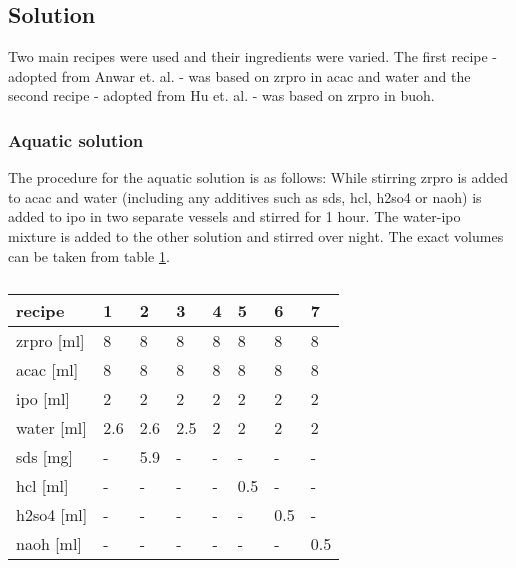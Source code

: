 \documentclass[a4paper]{article}
\begin{document}
\subsection{Solution}
Two main recipes were used and their ingredients were varied. 
The first recipe - adopted from Anwar et. al. \cite{Anwar2017} - was based on \gls{zrpro} in \gls{acac} and \gls{water} 
and the second recipe - 
adopted from Hu et. al. \cite{Hu2016} -
was based on \gls{zrpro} in \gls{buoh}.
\subsubsection{Aquatic solution}
The procedure for the aquatic solution is as follows: 
While stirring \gls{zrpro} is added to \gls{acac} and \gls{water} (including any additives such as \gls{sds}, \gls{hcl}, \gls{h2so4} or \gls{naoh}) is added to \gls{ipo} in two separate vessels and stirred for 1 hour. 
The \gls{water}-\gls{ipo} mixture is added to the other solution and stirred over night. 
The exact volumes can be taken from table \ref{tab:rec1}.
\begin{table}[h]
	\centering
	\caption{}
	\label{tab:rec1}
	\begin{tabular}{llllllll}
		\hline
		recipe				&1		&2		&3		&4		&5		&6		&7\\
		\hline
		\gls{zrpro} [ml]	&8		&8		&8		&8		&8		&8		&8\\
		\gls{acac} [ml]		&8		&8		&8		&8		&8		&8		&8\\
		\gls{ipo} [ml]		&2		&2		&2		&2		&2		&2		&2\\
		\gls{water} [ml]		&2.6	&2.6	&2.5	&2		&2		&2		&2\\
		\gls{sds} [mg]		&-		&5.9	&-		&-		&-		&-		&-\\
		\gls{hcl} [ml]		&-		&-		&-		&-		&0.5	&-		&-\\
		\gls{h2so4} [ml]	&-		&-		&-		&-		&-		&0.5	&-\\
		\gls{naoh} [ml] 	&-		&-		&-		&-		&-		&-		&0.5\\
		\hline
	\end{tabular}
\end{table}
%
\end{document}
